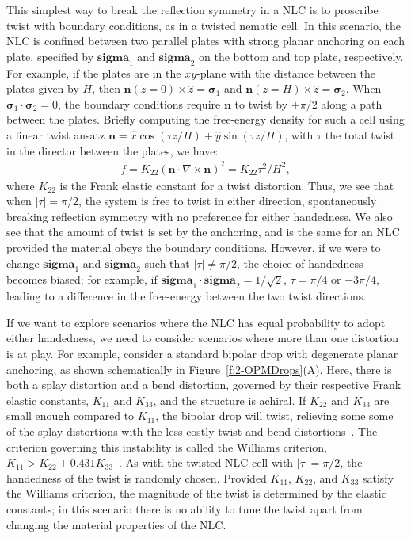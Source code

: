 This simplest way to break the reflection symmetry in a NLC is to proscribe twist with boundary conditions, as in a twisted nematic cell.
In this scenario, the NLC is confined between two parallel plates with strong planar anchoring on each plate, specified by $\bm{sigma}_1$ and $\bm{sigma}_2$ on the bottom and top plate, respectively.
For example, if the plates are in the $xy$-plane with the distance between the plates given by $H$, then $\mathbf{n}(z = 0) \times \hat{z} = \bm{\sigma}_1$ and $\mathbf{n}(z = H) \times \hat{z} = \bm{\sigma}_2$.
When $\bm{\sigma}_1 \cdot \bm{\sigma}_2 = 0$, the boundary conditions require $\mathbf{n}$ to twist by $\pm \pi/2$ along a path between the plates.
Briefly computing the free-energy density for such a cell using a linear twist ansatz $\mathbf{n} = \hat{x} \cos (\tau z/H) + \hat{y} \sin(\tau z/H)$, with $\tau$ the total twist in the director between the plates, we have:
\begin{align}
  f = K_{22}(\mathbf{n} \cdot \nabla \times \mathbf{n})^2 = K_{22}\tau^2/H^2,
\end{align}
where $K_{22}$ is the Frank elastic constant for a twist distortion.
Thus, we see that when $|\tau| = \pi/2$, the system is free to twist in either direction, spontaneously breaking reflection symmetry with no preference for either handedness.
We also see that the amount of twist is set by the anchoring, and is the same for an NLC provided the material obeys the boundary conditions.
However, if we were to change $\bm{sigma}_1$ and $\bm{sigma}_2$ such that $|\tau| \neq \pi/2$, the choice of handedness becomes biased; for example, if $\bm{sigma}_1 \cdot \bm{sigma}_2 = 1/\sqrt{2}$, $\tau = \pi/4$ or $-3\pi/4$, leading to a difference in the free-energy between the two twist directions.

If we want to explore scenarios where the NLC has equal probability to adopt either handedness, we need to consider scenarios where more than one distortion is at play.
For example, consider a standard bipolar drop with degenerate planar anchoring, as shown schematically in Figure~\ref{f:2-OPMDrops}(A).
Here, there is both a splay distortion and a bend distortion, governed by their respective Frank elastic constants, $K_{11}$ and $K_{33}$, and the structure is achiral.
If $K_{22}$ and $K_{33}$ are small enough compared to $K_{11}$, the bipolar drop will twist, relieving some some of the splay distortions with the less costly twist and bend distortions~\cite{RN297,RN296,RN295}.
The criterion governing this instability is called the Williams criterion, $K_{11} > K_{22}+ 0.431 K_{33}$~\cite{RN297}.
As with the twisted NLC cell with $|\tau| = \pi/2$, the handedness of the twist is randomly chosen.
Provided $K_{11}$, $K_{22}$, and $K_{33}$ satisfy the Williams criterion, the magnitude of the twist is determined by the elastic constants; in this scenario there is no ability to tune the twist apart from changing the material properties of the NLC.

